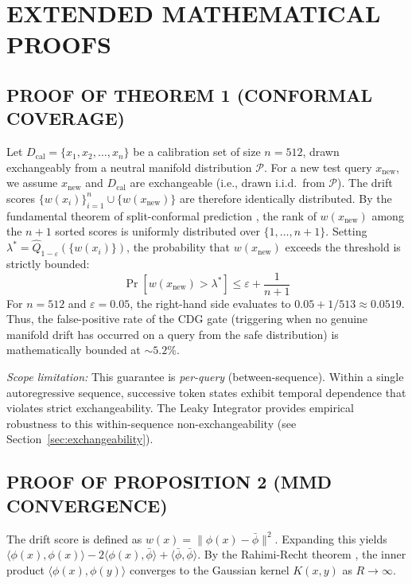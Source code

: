 \documentclass{ieeetmlcn}
\begin{document}
\appendices

\section{EXTENDED MATHEMATICAL PROOFS}
\label{app:proofs}

\subsection{PROOF OF THEOREM 1 (CONFORMAL COVERAGE)}
Let $D_{\text{cal}} = \{x_1, x_2, \dots, x_n\}$ be a calibration set of size $n=512$, drawn exchangeably from a neutral manifold distribution $\mathcal{P}$. For a new test query $x_{\text{new}}$, we assume $x_{\text{new}}$ and $D_{\text{cal}}$ are exchangeable (i.e., drawn i.i.d.\ from $\mathcal{P}$). The drift scores $\{w(x_i)\}_{i=1}^n \cup \{w(x_{\text{new}})\}$ are therefore identically distributed.
By the fundamental theorem of split-conformal prediction \cite{vovk2005algorithmic}, the rank of $w(x_{\text{new}})$ among the $n+1$ sorted scores is uniformly distributed over $\{1, \ldots, n+1\}$. Setting $\lambda^* = \hat{Q}_{1-\varepsilon}(\{w(x_i)\})$, the probability that $w(x_{\text{new}})$ exceeds the threshold is strictly bounded:
\begin{equation}
\Pr[w(x_{\text{new}}) > \lambda^*] \leq \varepsilon + \frac{1}{n+1}
\end{equation}
For $n=512$ and $\varepsilon=0.05$, the right-hand side evaluates to $0.05 + 1/513 \approx 0.0519$. Thus, the false-positive rate of the CDG gate (triggering when no genuine manifold drift has occurred on a query from the safe distribution) is mathematically bounded at $\sim\!5.2\%$.

\emph{Scope limitation:} This guarantee is \emph{per-query} (between-sequence). Within a single autoregressive sequence, successive token states exhibit temporal dependence that violates strict exchangeability. The Leaky Integrator provides empirical robustness to this within-sequence non-exchangeability (see Section~\ref{sec:exchangeability}).

\subsection{PROOF OF PROPOSITION 2 (MMD CONVERGENCE)}
The drift score is defined as $w(x) = \|\phi(x) - \bar{\phi}\|^2$. Expanding this yields $\langle \phi(x), \phi(x) \rangle - 2\langle \phi(x), \bar{\phi} \rangle + \langle \bar{\phi}, \bar{\phi} \rangle$. By the Rahimi-Recht theorem \cite{rahimi2007random}, the inner product $\langle \phi(x), \phi(y) \rangle$ converges to the Gaussian kernel $K(x, y)$ as $R \to \infty$. 
\end{document}
